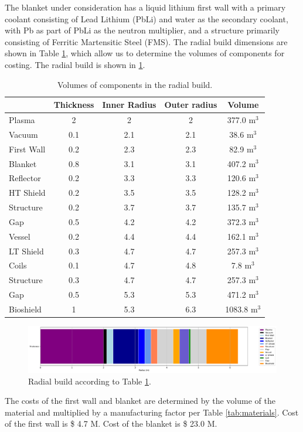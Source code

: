 The blanket under consideration has a liquid lithium first wall with a primary coolant consisting of Lead Lithium (PbLi) and water as the secondary coolant, with Pb as part of PbLi as the neutron multiplier, and a structure primarily consisting of Ferritic Martensitic Steel (FMS). The radial build dimensions are shown in Table \ref{tab:volumes}, which allow us to determine the volumes of components for costing.  The radial build is shown in \ref{fig:radial}.  \\


\begin{table}[h!]
    \centering
    \begin{tabular}{l c  c c c}
    \hline
        &	Thickness	&	Inner Radius	&	Outer radius	&	Volume		\\
        \hline
Plasma	&	2	&	2	&	2	&	377.0	m$^{3}$	\\
Vacuum	&	0.1	&	2.1	&	2.1	&	38.6	m$^{3}$	\\
First Wall	&	0.2	&	2.3	&	2.3	&	82.9	m$^{3}$	\\
Blanket	&	0.8	&	3.1	&	3.1	&	407.2	m$^{3}$	\\
Reflector	&	0.2	&	3.3	&	3.3	&	120.6	m$^{3}$	\\
HT Shield	&	0.2	&	3.5	&	3.5	&	128.2	m$^{3}$	\\
Structure	&	0.2	&	3.7	&	3.7	&	135.7	m$^{3}$	\\
Gap	&	0.5	&	4.2	&	4.2	&	372.3	m$^{3}$	\\
Vessel	&	0.2	&	4.4	&	4.4	&	162.1	m$^{3}$	\\
LT Shield	&	0.3	&	4.7	&	4.7	&	257.3	m$^{3}$	\\
Coils	&	0.1	&	4.7	&	4.8	&	7.8	m$^{3}$	\\
Structure	&	0.3	&	4.7	&	4.7	&	257.3	m$^{3}$	\\
Gap	&	0.5	&	5.3	&	5.3	&	471.2	m$^{3}$	\\
Bioshield	&	1	&	5.3	&	6.3	&	1083.8	m$^{3}$	\\

        \hline
    \end{tabular}
    \caption{Volumes of components in the radial build.}
    \label{tab:volumes}
\end{table}

\begin{figure}
    \centering
    \includegraphics[width=0.9\linewidth]{Figures/radial_build.pdf}
    \caption{Radial build according to Table \ref{tab:volumes}.}
    \label{fig:radial}
\end{figure}



The costs of the first wall and blanket are determined by the volume of the material and multiplied by a manufacturing factor per Table \ref{tab:materials}.   Cost of the first wall is \$ 4.7 M.  Cost of the blanket is \$ 23.0 M.

